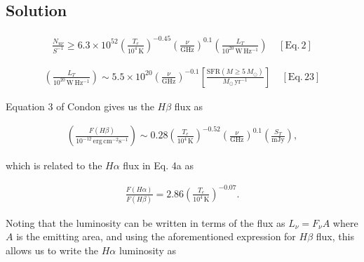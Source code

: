 \documentclass[12pt]{article}
\begin{document}
\subsection*{Solution}

\begin{align*}
    \frac{N_{u\nu}}{S^{-1}} \geq 6.3\times10^{52} \left(\frac{T_e}{10^4\,\mathrm{K}}\right)^{-0.45} \left(\frac{\nu}{\mathrm{GHz}}\right)^{0.1} \left(\frac{L_T}{10^{20}\,\mathrm{W\,Hz^{-1}}}\right)~~~~~[\mathrm{Eq.\,2}]
\end{align*}

\begin{align*}
    \left(\frac{L_T}{10^{20}\,\mathrm{W\,Hz^{-1}}}\right) \sim 5.5\times10^{20} \left(\frac{\nu}{\mathrm{GHz}}\right)^{-0.1} \left[\frac{\mathrm{SFR}(M\geq5\,M_\odot)}{M_\odot\,\mathrm{yr^{-1}}}\right] ~~~~~[\mathrm{Eq.\,23}]
\end{align*}

{\noindent}Equation 3 of Condon gives us the $H\beta$ flux as

\begin{align*}
    \left(\frac{F(H\beta)}{10^{-12}\,\mathrm{erg\,cm^{-2}s^{-1}}}\right) \sim 0.28 \left(\frac{T_e}{10^4\,\mathrm{K}}\right)^{-0.52} \left(\frac{\nu}{\mathrm{GHz}}\right)^{0.1} \left(\frac{S_T}{\mathrm{mJy}}\right),
\end{align*}

{\noindent}which is related to the $H\alpha$ flux in Eq. 4a as

\begin{align*}
    \frac{F(H\alpha)}{F(H\beta)} = 2.86 \left(\frac{T_e}{10^4\,\mathrm{K}}\right)^{-0.07}.
\end{align*}

{\noindent}Noting that the luminosity can be written in terms of the flux as $L_\nu = F_\nu A$ where $A$ is the emitting area, and using the aforementioned expression for $H\beta$ flux, this allows us to write the $H\alpha$ luminosity as
\end{document}
